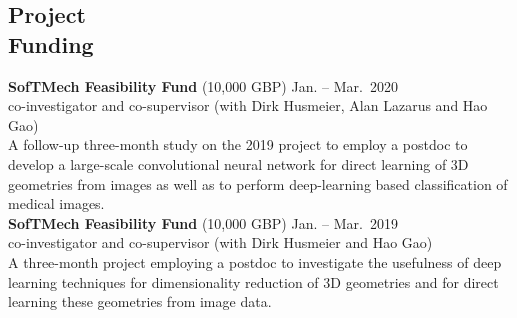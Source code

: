 \documentclass[margin,line]{resume}
\begin{document}
\begin{resume}
\section{\mysidestyle Project\\ Funding}	
   	\textbf{SofTMech Feasibility Fund} (10,000 GBP)	\hfill Jan. -- Mar.\ 2020\\
     co-investigator and co-supervisor (with Dirk Husmeier, Alan Lazarus and Hao Gao)\\
    A follow-up three-month study on the 2019 project to employ a postdoc to develop a large-scale convolutional neural network for direct learning of 3D geometries from images as well as  to perform deep-learning based classification of medical images.  \vspace{1.5mm}\\
   	\textbf{SofTMech Feasibility Fund} (10,000 GBP)	\hfill Jan. -- Mar.\ 2019\\
     co-investigator and co-supervisor (with Dirk Husmeier and Hao Gao) \\
    A three-month project employing a postdoc to investigate the usefulness of deep learning techniques for dimensionality reduction of 3D geometries and for direct learning these geometries from image data.
    



\end{resume}
\end{document}
